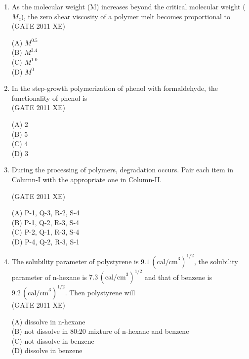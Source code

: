 \documentclass[journal,12pt,onecolumn]{IEEEtran}
\begin{document}
\begin{enumerate}[label=\arabic*)]
\item As the molecular weight (M) increases beyond the critical molecular weight ($M_c$), the zero shear viscosity of a polymer melt becomes proportional to\\

\hfill{(GATE 2011 XE)} \\
\begin{multicols}{4}
(A) $M^{0.5}$\\
(B) $M^{3.4}$\\
(C) $M^{1.0}$\\
(D) $M^0$
\end{multicols}

\item In the step-growth polymerization of phenol with formaldehyde, the functionality of phenol is\\

\hfill{(GATE 2011 XE)} \\
\begin{multicols}{4}
(A) 2\\
(B) 5\\
(C) 4\\
(D) 3
\end{multicols}



\item During the processing of polymers, degradation occurs. Pair each item in Column-I with the appropriate one in Column-II.




\hfill{(GATE 2011 XE)} \\
\begin{multicols}{2}

(A) P-1, Q-3, R-2, S-4\\
(B) P-1, Q-2, R-3, S-4\\
(C) P-2, Q-1, R-3, S-4\\
(D) P-4, Q-2, R-3, S-1
\end{multicols}

\newpage

\item The solubility parameter of polystyrene is $9.1\,(\text{cal/cm}^3)^{1/2}$, the solubility parameter of n-hexane is $7.3\,(\text{cal/cm}^3)^{1/2}$ and that of benzene is $9.2\,(\text{cal/cm}^3)^{1/2}$. Then polystyrene will\\

\hfill{(GATE 2011 XE)} \\
\begin{multicols}{2}
(A) dissolve in n-hexane\\
(B) not dissolve in 80:20 mixture of n-hexane and benzene\\
(C) not dissolve in benzene\\
(D) dissolve in benzene
\end{multicols}


\end{enumerate}
\end{document}
